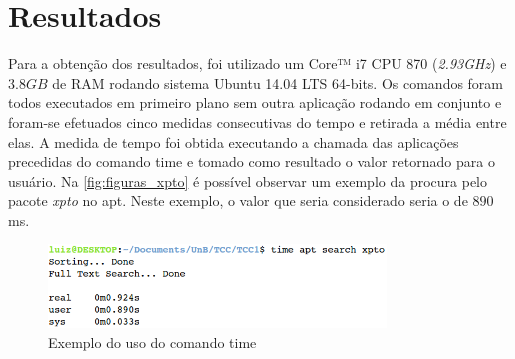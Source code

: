 \chapter{\nmu Resultados} %
\label{cha:resultados}




Para a obtenção dos resultados, foi utilizado um {\code Core™ i7 CPU 870} (\textit{2.93GHz})  e $3.8GB$ de RAM rodando sistema Ubuntu 14.04 LTS 64-bits. Os comandos foram todos executados em primeiro plano sem outra aplicação rodando em conjunto e foram-se efetuados cinco medidas consecutivas do tempo e retirada a média entre elas. A medida de tempo foi obtida executando a chamada das aplicações precedidas do comando {\code time} e tomado como resultado o valor retornado para o usuário. Na \autoref{fig:figuras_xpto} é possível observar um exemplo da procura pelo pacote \textit{xpto} no {\code apt}. Neste exemplo, o valor que seria considerado seria o de $890$ ms.

\begin{figure}[htbp]
  \centering
	\includegraphics[width=0.8\textwidth]{figuras/xpto}
  \caption{Exemplo do uso do comando {\code time}}
  \label{fig:figuras_xpto}
\end{figure}

